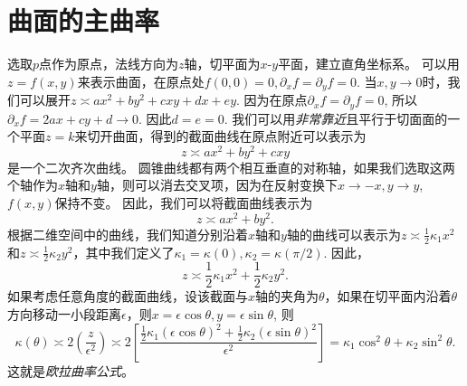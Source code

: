 \documentclass{article}
\begin{document}
\section{曲面的主曲率}

选取$p$点作为原点，法线方向为$z$轴，切平面为$x$-$y$平面，建立直角坐标系。
可以用$z=f(x,y)$来表示曲面，在原点处$f(0,0)=0, \partial_{x}f=\partial_{y}f=0$.
当$x, y\rightarrow 0$时，我们可以展开$z\asymp ax^{2}+by^{2}+cxy+dx+ey$.
因为在原点$\partial_{x}f=\partial_{y}f=0$, 所以$\partial_{x}f=2ax+cy+d\rightarrow 0$.
因此$d=e=0$.
我们可以用\emph{非常靠近}且平行于切面面的一个平面$z=k$来切开曲面，得到的截面曲线在原点附近可以表示为
\begin{equation}
    z\asymp ax^{2}+by^{2}+cxy
\end{equation}
是一个二次齐次曲线。
圆锥曲线都有两个相互垂直的对称轴，如果我们选取这两个轴作为$x$轴和$y$轴，则可以消去交叉项，因为在反射变换下$x\rightarrow -x, y\rightarrow y$, $f(x,y)$保持不变。
因此，我们可以将截面曲线表示为
\begin{equation}
    z\asymp ax^{2}+by^{2}.
\end{equation}
根据二维空间中的曲线，我们知道分别沿着$x$轴和$y$轴的曲线可以表示为$z\asymp \frac{1}{2}\kappa_{1}x^{2}$和$z\asymp \frac{1}{2}\kappa_{2}y^{2}$，其中我们定义了$\kappa_{1}=\kappa(0), \kappa_{2}=\kappa(\pi/2)$.
因此，
\begin{equation}
    z\asymp \frac{1}{2}\kappa_{1}x^{2}+\frac{1}{2}\kappa_{2}y^{2}.
\end{equation}
如果考虑任意角度的截面曲线，设该截面与$x$轴的夹角为$\theta$，如果在切平面内沿着$\theta$方向移动一小段距离$\epsilon$，则$x=\epsilon\cos\theta, y=\epsilon\sin\theta$, 则
\begin{equation}
    \kappa(\theta)
    \asymp 2\left(\frac{z}{\epsilon^{2}}\right)
    \asymp 2\left[\frac{\frac{1}{2}\kappa_{1}(\epsilon\cos\theta)^{2}+\frac{1}{2}\kappa_{2}(\epsilon\sin\theta)^{2}}{\epsilon^{2}}\right]
    =\kappa_{1}\cos^{2}\theta+\kappa_{2}\sin^{2}\theta.
\end{equation}
这就是\emph{欧拉曲率公式}。

%
%
\end{document}
